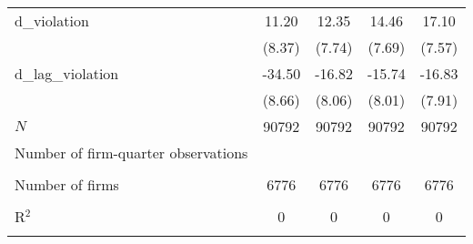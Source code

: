 \begin{tabular}{l*{4}{c}}
d\_violation&    11.20         &    12.35         &    14.46         &    17.10\sym{*}  \\
          &   (8.37)         &   (7.74)         &   (7.69)         &   (7.57)         \\
[1em]
d\_lag\_violation&   -34.50\sym{***}&   -16.82\sym{*}  &   -15.74\sym{*}  &   -16.83\sym{*}  \\
          &   (8.66)         &   (8.06)         &   (8.01)         &   (7.91)         \\
\hline
\(N\)     &    90792         &    90792         &    90792         &    90792         \\
 \hline \multicolumn{1}{l}{Number of firm-quarter observations} &  &  &  &  \\\\  \multicolumn{1}{l}{Number of firms} & 6776 & 6776 & 6776 & 6776 \\\\  \multicolumn{1}{l}{R\(^2\)} & 0 & 0 & 0 & 0 \\\\ \hline\hline \end{tabular} 